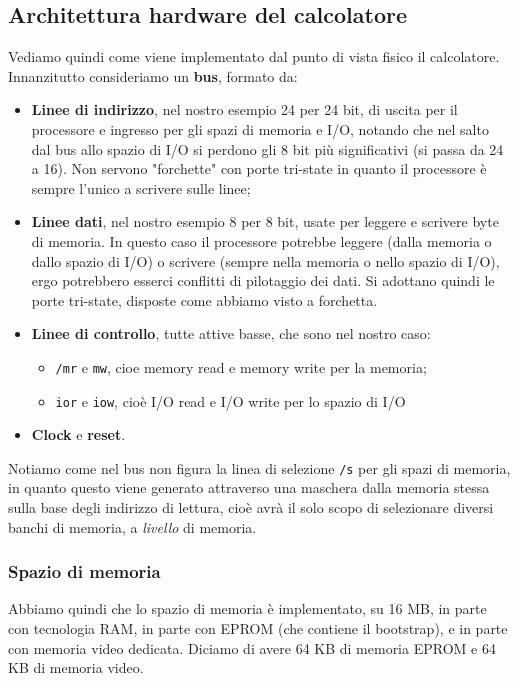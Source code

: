 \documentclass[a4paper,11pt]{article}
\begin{document}
\subsection{Architettura hardware del calcolatore}
Vediamo quindi come viene implementato dal punto di vista fisico il calcolatore.
Innanzitutto consideriamo un \textbf{bus}, formato da:
\begin{itemize}
\item \textbf{Linee di indirizzo}, nel nostro esempio 24 per 24 bit, di uscita per il processore e ingresso per gli spazi di memoria e I/O, notando che nel salto dal bus allo spazio di I/O si perdono gli 8 bit più significativi (si passa da 24 a 16).
Non servono "forchette" con porte tri-state in quanto il processore è sempre l'unico a scrivere sulle linee;
\item \textbf{Linee dati}, nel nostro esempio 8 per 8 bit, usate per leggere e scrivere byte di memoria.
	In questo caso il processore potrebbe leggere (dalla memoria o dallo spazio di I/O) o scrivere (sempre nella memoria o nello spazio di I/O), ergo potrebbero esserci conflitti di pilotaggio dei dati.
	Si adottano quindi le porte tri-state, disposte come abbiamo visto a forchetta.
\item \textbf{Linee di controllo}, tutte attive basse, che sono nel nostro caso:
	\begin{itemize}
		\item \lstinline|/mr| e \lstinline|mw|, cioe memory read e memory write per la memoria;
		\item \lstinline|ior| e \lstinline|iow|, cioè I/O read e I/O write per lo spazio di I/O
	\end{itemize}
\item \textbf{Clock} e \textbf{reset}.
\end{itemize}

Notiamo come nel bus non figura la linea di selezione \lstinline|/s| per gli spazi di memoria, in quanto questo viene generato attraverso una maschera dalla memoria stessa sulla base degli indirizzo di lettura, cioè avrà il solo scopo di selezionare diversi banchi di memoria, a \textit{livello} di memoria.

\subsubsection{Spazio di memoria}
Abbiamo quindi che lo spazio di memoria è implementato, su 16 MB, in parte con tecnologia RAM, in parte con EPROM (che contiene il bootstrap), e in parte con memoria video dedicata.
Diciamo di avere 64 KB di memoria EPROM e 64 KB di memoria video.
\end{document}
